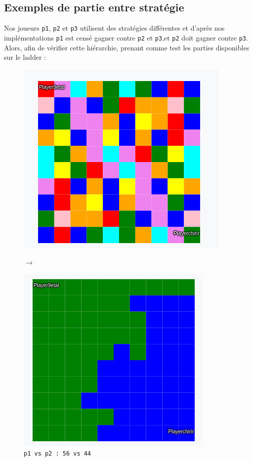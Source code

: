 \documentclass[11pt]{article}
\begin{document}
\subsection{Exemples de partie entre stratégie}
 Nos joueurs \texttt{p1}, \texttt{p2} et \texttt{p3} utilisent des stratégies différentes et d'après nos implémentations \texttt{p1} est censé gagner contre \texttt{p2} et \texttt{p3},et \texttt{p2} doit gagner contre \texttt{p3}.\\
 Alors, afin de vérifier cette hiérarchie, prenant comme test les parties disponibles sur le ladder : \\
\begin{figure}[h!]
    \centering
    \begin{minipage}[c]{.46\linewidth}
        \centering
        \includegraphics[scale=0.3]{img/9etal_vs_chirir.png}
    \end{minipage}
    $\longrightarrow$
    \begin{minipage}[c]{.46\linewidth}
        \centering
        \includegraphics[scale=0.3]{img/9etal_vs_chirir_end.png}
    \end{minipage}
    \caption{\texttt{p1 vs p2 : 56 vs 44}}
\end{figure}
\end{document}
